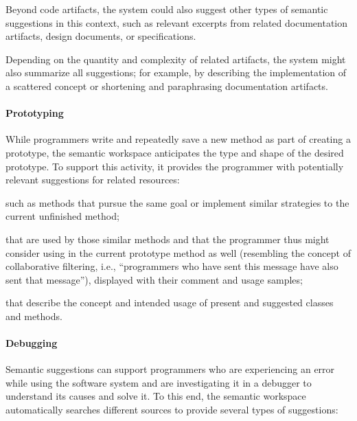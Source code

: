 	\noindent
	Beyond code artifacts, the system could also suggest other types of semantic suggestions in this context, such as relevant excerpts from related documentation artifacts, design documents, or specifications.

	Depending on the quantity and complexity of related artifacts, the system might also summarize all suggestions; for example, by describing the implementation of a scattered concept or shortening and paraphrasing documentation artifacts.

	\paragraph{Prototyping}
	While programmers write and repeatedly save a new method as part of creating a prototype, the semantic workspace anticipates the type and shape of the desired prototype.
	To support this activity, it provides the programmer with potentially relevant suggestions for related resources:

	\begin{description}[noextralabelsep]
		\item[similar methods,] such as methods that pursue the same goal or implement similar strategies to the current unfinished method;
		\item[correlated methods and classes] that are used by those similar methods and that the programmer thus might consider using in the current prototype method as well (resembling the concept of collaborative filtering, i.e., ``programmers who have sent this message have also sent that message''), displayed with their comment and usage samples;
		\item[documentation artifacts] that describe the concept and intended usage of present and suggested classes and methods.
	\end{description}

	\paragraph{Debugging}
	Semantic suggestions can support programmers who are experiencing an error while using the software system and are investigating it in a debugger to understand its causes and solve it.
	To this end, the semantic workspace automatically searches different sources to provide several types of suggestions:

